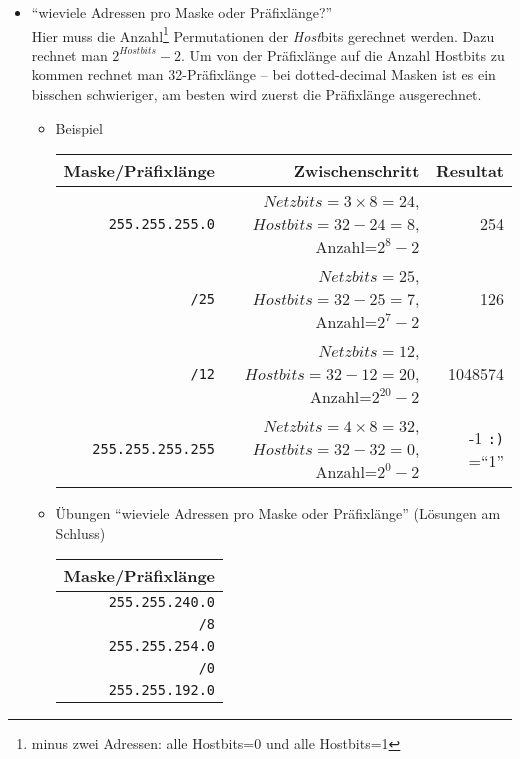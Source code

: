 \documentclass[a4paper,german]{scrartcl}
\begin{document}
\begin{itemize}
    
%    
  \clearpage
  \item ``wieviele Adressen pro Maske oder Pr\"afixl\"ange?''\\
    Hier muss die Anzahl\footnote{minus zwei Adressen: alle Hostbits=0 und alle Hostbits=1} Permutationen der \emph{Host}bits gerechnet werden. Dazu rechnet man $2^{Hostbits}-2$. Um von der Pr\"afixl\"ange auf die Anzahl Hostbits zu kommen rechnet man 32-Pr\"afixl\"ange -- bei dotted-decimal Masken ist es ein bisschen schwieriger, am besten wird zuerst die Pr\"afixl\"ange ausgerechnet.
\vspace{0.25cm}
  \begin{itemize}
    \item Beispiel\\
      \begin{small}
        \begin{tabular}{rrr}
          Maske/Pr\"afixl\"ange & Zwischenschritt & Resultat \\
          \hline
          \texttt{255.255.255.0} & $Netzbits=3 \times 8=24$, $Hostbits=32-24=8$, Anzahl=$2^{8}-2$ & 254 \\
          \texttt{/25} & $Netzbits=25$, $Hostbits=32-25=7$, Anzahl=$2^{7}-2$ & 126 \\
          \texttt{/12} & $Netzbits=12$, $Hostbits=32-12=20$, Anzahl=$2^{20}-2$ & 1048574 \\
          \texttt{255.255.255.255} & $Netzbits=4 \times 8=32$, $Hostbits=32-32=0$, Anzahl=$2^{0}-2$ & -1 {\tiny \texttt{:)} =``1''} \\
        \end{tabular}
      \end{small}
      \vspace{0.25cm}
    \item \"Ubungen ``wieviele Adressen pro Maske oder Pr\"afixl\"ange'' (L\"osungen am Schluss)
        \begin{tabular}{r}
          Maske/Pr\"afixl\"ange \\
          \hline
          \texttt{255.255.240.0} \\
          \texttt{/8} \\
          \texttt{255.255.254.0} \\
          \texttt{/0} \\
          \texttt{255.255.192.0} \\
        \end{tabular}
  \end{itemize}    
\vspace{0.5cm}
    

\end{itemize}
\end{document}
